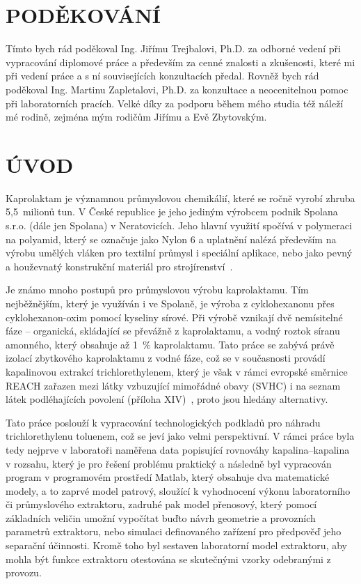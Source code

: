 \documentclass[a4paper, 12pt]{article}
\begin{document}
\newpage \section*{PODĚKOVÁNÍ}
\vspace{18cm}
Tímto bych rád poděkoval Ing. Jiřímu Trejbalovi, Ph.D. za odborné vedení při vypracování diplomové práce a především za cenné znalosti a zkušenosti, které mi při vedení práce a s ní souvisejících konzultacích předal.
Rovněž bych rád poděkoval Ing. Martinu Zapletalovi, Ph.D. za konzultace a neocenitelnou pomoc při laboratorních pracích.
Velké díky za podporu během mého studia též náleží mé rodině, zejména mým rodičům Jiřímu a Evě Zbytovským.

\newpage \tableofcontents \newpage
{}



\section{ÚVOD} \label{intro}
Kaprolaktam je významnou průmyslovou chemikálií, které se ročně vyrobí zhruba 5,5~milionů tun.
V České republice je jeho jediným výrobcem podnik Spolana s.r.o. (dále jen Spolana) v Neratovicích.
Jeho hlavní využití spočívá v polymeraci na polyamid, který se označuje jako Nylon 6 a uplatnění nalézá především na výrobu umělých vláken pro textilní průmysl i speciální aplikace, nebo jako pevný a houževnatý konstrukční materiál pro strojírenství~\cite{Ullmann_CPL}.

Je známo mnoho postupů pro průmyslovou výrobu kaprolaktamu.
Tím nejběžnějším, který je využíván i ve Spolaně, je výroba z cyklohexanonu přes cyklohexanon-oxim pomocí kyseliny sírové.
Při výrobě vznikají dvě nemísitelné fáze -- organická, skládající se převážně z kaprolaktamu, a vodný roztok síranu amonného, který obsahuje až 1~\% kaprolaktamu.
Tato práce se zabývá právě izolací zbytkového kaprolaktamu z vodné fáze, což se v současnosti provádí kapalinovou extrakcí trichlorethylenem, který je však v rámci evropské směrnice REACH zařazen mezi látky vzbuzující mimořádné obavy (SVHC) i na seznam látek podléhajících povolení (příloha XIV)~\cite{ECHA_TCE}, proto jsou hledány alternativy.

Tato práce poslouží k vypracování technologických podkladů pro náhradu trichlorethylenu toluenem, což se jeví jako velmi perspektivní.
V rámci práce byla tedy nejprve v laboratoři naměřena data popisující rovnováhy kapalina--kapalina v rozsahu, který je pro řešení problému praktický a následně byl vypracován program v programovém prostředí Matlab, který obsahuje dva matematické modely, a to zaprvé model patrový, sloužící k vyhodnocení výkonu laboratorního či průmyslového extraktoru, zadruhé pak model přenosový, který pomocí základních veličin umožní vypočítat buďto návrh geometrie a provozních parametrů extraktoru, nebo simulaci definovaného zařízení pro předpověď jeho separační účinnosti.
Kromě toho byl sestaven laboratorní model extraktoru, aby mohla být funkce extraktoru otestována se skutečnými vzorky odebranými z provozu.
\end{document}
